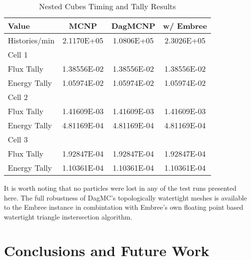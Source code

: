 \documentclass{anstrans}
\begin{document}
\begin{table}[H]

  \begin{center}
    \caption{Nested Cubes Timing and Tally Results}
    
    \begin{tabular}{lccc}
      \toprule
      Value & MCNP & DagMCNP & w/ Embree \\
      \toprule
      Histories/min & 2.1170E+05 & 1.0806E+05 & 2.3026E+05 \\
      \hline
      Cell 1 & & & \\
      Flux Tally & 1.38556E-02 & 1.38556E-02 & 1.38556E-02 \\
      Energy Tally & 1.05974E-02 & 1.05974E-02 & 1.05974E-02 \\
      \hline
      Cell 2 & & & \\
      Flux Tally & 1.41609E-03 & 1.41609E-03 & 1.41609E-03 \\
      Energy Tally & 4.81169E-04 & 4.81169E-04 & 4.81169E-04 \\
      \hline
      Cell 3 & & & \\
      Flux Tally & 1.92847E-04 & 1.92847E-04 & 1.92847E-04 \\
      Energy Tally & 1.10361E-04 & 1.10361E-04 & 1.10361E-04 \\
      \bottomrule
      
                        
    \end{tabular}


  \end{center}

\end{table}

It is worth noting that no particles were lost in any of the test runs presented here. The full robustness of DagMC's topologically watertight meshes \cite{make_watertight_smith_2010} is available to the Embree instance in combintation with Embree's own floating point based watertight triangle instersection algorithm. \cite{watertight_tri_intersection_woop_2013}

\section{Conclusions and Future Work}
\end{document}
